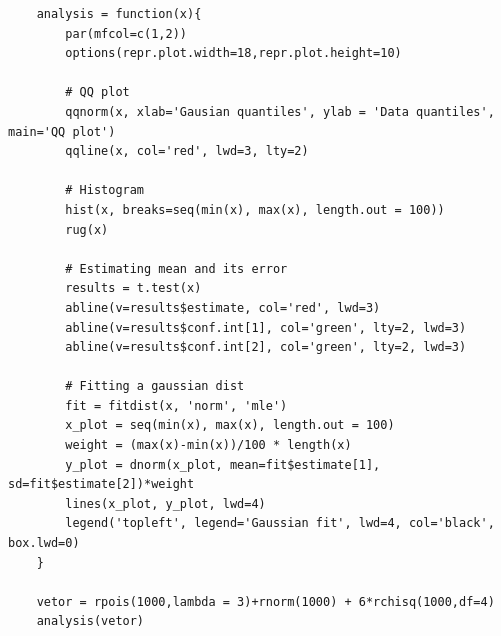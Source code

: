 \newpage

\begin{lstlisting}
    analysis = function(x){
        par(mfcol=c(1,2))
        options(repr.plot.width=18,repr.plot.height=10)
        
        # QQ plot
        qqnorm(x, xlab='Gausian quantiles', ylab = 'Data quantiles', main='QQ plot')
        qqline(x, col='red', lwd=3, lty=2)
        
        # Histogram
        hist(x, breaks=seq(min(x), max(x), length.out = 100))
        rug(x)
        
        # Estimating mean and its error
        results = t.test(x)
        abline(v=results$estimate, col='red', lwd=3)
        abline(v=results$conf.int[1], col='green', lty=2, lwd=3)
        abline(v=results$conf.int[2], col='green', lty=2, lwd=3)
        
        # Fitting a gaussian dist
        fit = fitdist(x, 'norm', 'mle')
        x_plot = seq(min(x), max(x), length.out = 100)
        weight = (max(x)-min(x))/100 * length(x)
        y_plot = dnorm(x_plot, mean=fit$estimate[1], sd=fit$estimate[2])*weight
        lines(x_plot, y_plot, lwd=4)
        legend('topleft', legend='Gaussian fit', lwd=4, col='black', box.lwd=0)
    }
    
    vetor = rpois(1000,lambda = 3)+rnorm(1000) + 6*rchisq(1000,df=4)
    analysis(vetor)
\end{lstlisting}

